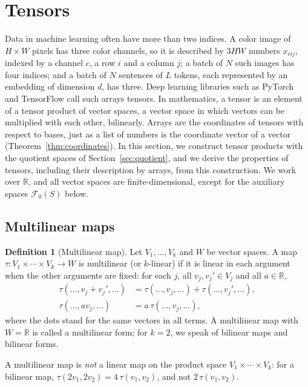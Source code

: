 \documentclass[11pt]{article}
\theoremstyle{definition}
\newtheorem{definition}{Definition}[section]
\theoremstyle{plain}
\theoremstyle{remark}
\begin{document}
\section{Tensors}\label{sec:tensors}

Data in machine learning often have more than two indices. A color image of $H \times W$ pixels has three color channels, so it is described by $3HW$ numbers $x_{cij}$, indexed by a channel $c$, a row $i$ and a column $j$; a batch of $N$ such images has four indices; and a batch of $N$ sentences of $L$ tokens, each represented by an embedding of dimension $d$, has three. Deep learning libraries such as PyTorch and TensorFlow call such arrays tensors. In mathematics, a tensor is an element of a tensor product of vector spaces, a vector space in which vectors can be multiplied with each other, bilinearly. Arrays are the coordinates of tensors with respect to bases, just as a list of numbers is the coordinate vector of a vector (Theorem~\ref{thm:coordinates}). In this section, we construct tensor products with the quotient spaces of Section~\ref{sec:quotient}, and we derive the properties of tensors, including their description by arrays, from this construction. We work over $\mathbb{R}$, and all vector spaces are finite-dimensional, except for the auxiliary spaces $\mathcal{F}_0(S)$ below.

\subsection{Multilinear maps}

\begin{definition}[Multilinear map]\label{def:multilinear}
    Let $V_1, \ldots, V_k$ and $W$ be vector spaces. A map $\tau: V_1 \times \cdots \times V_k \to W$ is multilinear (or $k$-linear) if it is linear in each argument when the other arguments are fixed: for each $j$, all $v_j, v_j' \in V_j$ and all $a \in \mathbb{R}$,
    \begin{align*}
        \tau(\ldots, v_j + v_j', \ldots) &= \tau(\ldots, v_j, \ldots) + \tau(\ldots, v_j', \ldots), \\
        \tau(\ldots, a v_j, \ldots) &= a\,\tau(\ldots, v_j, \ldots),
    \end{align*}
    where the dots stand for the same vectors in all terms. A multilinear map with $W = \mathbb{R}$ is called a multilinear form; for $k = 2$, we speak of bilinear maps and bilinear forms.
\end{definition}

A multilinear map is \emph{not} a linear map on the product space $V_1 \times \cdots \times V_k$: for a bilinear map, $\tau(2v_1, 2v_2) = 4\,\tau(v_1, v_2)$, and not $2\,\tau(v_1, v_2)$.
\end{document}
